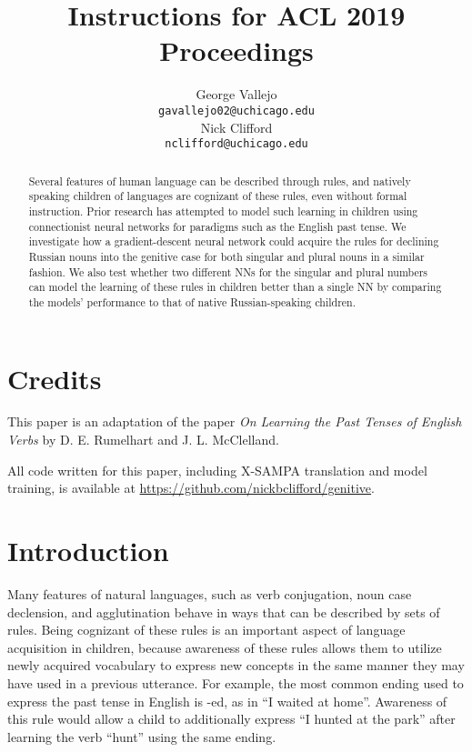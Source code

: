\documentclass[11pt,a4paper]{article}
\title{Instructions for ACL 2019 Proceedings}
\author{George Vallejo \\
  \texttt{gavallejo02@uchicago.edu} \\\And
  Nick Clifford \\
  \texttt{nclifford@uchicago.edu} \\}
\date{}
\begin{document}
\maketitle
\begin{abstract}
  Several features of human language can be described through rules,
  and natively speaking children of languages are cognizant of these rules, 
  even without formal instruction. Prior research has attempted to model
  such learning in children using connectionist neural networks for
  paradigms such as the English past tense. We investigate how a gradient-descent
  neural network could acquire the rules for declining Russian nouns into
  the genitive case for both singular and plural nouns in a similar fashion. 
  We also test whether two different NNs for the singular and plural numbers
  can model the learning of these rules in children better than a single
  NN by comparing the models' performance to that of native Russian-speaking children.

\end{abstract}

\section{Credits}

  This paper is an adaptation of the paper
  \emph{On Learning the Past Tenses of English Verbs} by D. E. Rumelhart and
  J. L. McClelland.
  
  All code written for this paper, including X-SAMPA translation and model training,
  is available at \url{https://github.com/nickbclifford/genitive}.

\section{Introduction}

Many features of natural languages, such as verb conjugation, noun case
declension, and agglutination behave in ways that can be described
by sets of rules. Being cognizant of these rules is an important aspect
of language acquisition in children, because awareness of these rules allows
them to utilize newly acquired vocabulary to express new concepts in the same
manner they may have used in a previous utterance. For example, the most common
ending used to express the past tense in English is -ed, as in ``I waited at home''.
Awareness of this rule would allow a child to additionally express ``I hunted at
the park'' after learning the verb ``hunt'' using the same ending.
\end{document}
